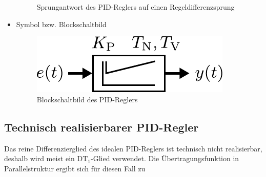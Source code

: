 \begin{itemize}
\begin{figure}[h]
		\caption{Sprungantwort des PID-Reglers auf einen Regeldifferenzsprung}
	\end{figure}
	\item Symbol bzw. Blockschaltbild
	\begin{figure}[h]
		\centering
		\includegraphics[width=0.3\linewidth]{Abbildungen/Reglerentwurf/PDF/PIDReglerBlock.pdf}
		\caption{Blockschaltbild des PID-Reglers}
	\end{figure}
\end{itemize}
%
\newpage
%
\subsection{Technisch realisierbarer PID-Regler}
%
Das reine Differenzierglied des idealen PID-Reglers ist technisch nicht realisierbar, deshalb wird meist ein DT$_{1}$-Glied verwendet. Die Übertragungsfunktion in Parallelstruktur ergibt sich für diesen Fall zu
%
